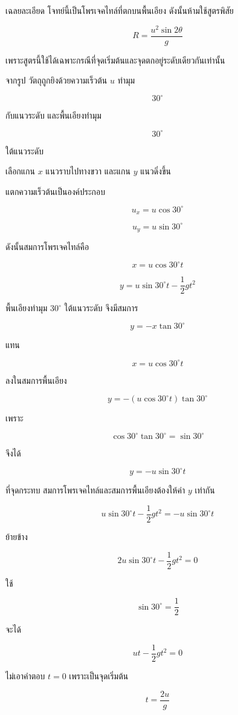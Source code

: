 \vspace{1.5em}

\begin{examplebox}{เฉลยละเอียด}
โจทย์นี้เป็นโพรเจคไทล์ที่ตกบนพื้นเอียง ดังนั้นห้ามใช้สูตรพิสัย

\[
R=\frac{u^2\sin2\theta}{g}
\]

เพราะสูตรนี้ใช้ได้เฉพาะกรณีที่จุดเริ่มต้นและจุดตกอยู่ระดับเดียวกันเท่านั้น

จากรูป วัตถุถูกยิงด้วยความเร็วต้น $u$ ทำมุม

\[
30^\circ
\]

กับแนวระดับ และพื้นเอียงทำมุม

\[
30^\circ
\]

ใต้แนวระดับ

เลือกแกน $x$ แนวราบไปทางขวา และแกน $y$ แนวดิ่งขึ้น

แตกความเร็วต้นเป็นองค์ประกอบ

\[
u_x=u\cos30^\circ
\]

\[
u_y=u\sin30^\circ
\]

ดังนั้นสมการโพรเจคไทล์คือ

\[
x=u\cos30^\circ t
\]

\[
y=u\sin30^\circ t-\frac{1}{2}gt^2
\]

พื้นเอียงทำมุม $30^\circ$ ใต้แนวระดับ จึงมีสมการ

\[
y=-x\tan30^\circ
\]

แทน

\[
x=u\cos30^\circ t
\]

ลงในสมการพื้นเอียง

\[
y=-(u\cos30^\circ t)\tan30^\circ
\]

เพราะ

\[
\cos30^\circ\tan30^\circ=\sin30^\circ
\]

จึงได้

\[
y=-u\sin30^\circ t
\]

ที่จุดกระทบ สมการโพรเจคไทล์และสมการพื้นเอียงต้องให้ค่า $y$ เท่ากัน

\[
u\sin30^\circ t-\frac{1}{2}gt^2=-u\sin30^\circ t
\]

ย้ายข้าง

\[
2u\sin30^\circ t-\frac{1}{2}gt^2=0
\]

ใช้

\[
\sin30^\circ=\frac{1}{2}
\]

จะได้

\[
ut-\frac{1}{2}gt^2=0
\]

ไม่เอาคำตอบ $t=0$ เพราะเป็นจุดเริ่มต้น

\[
t=\frac{2u}{g}
\]


\end{examplebox}
